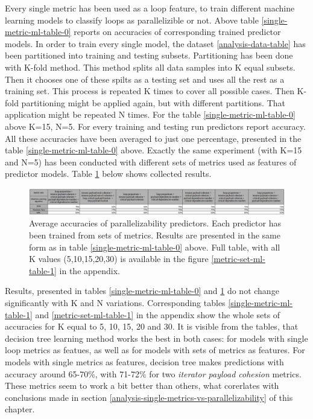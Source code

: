 \null\qquad Every single metric has been used as a loop feature, to train different machine learning models to classify loops as parallelizible or not. Above table \ref{single-metric-ml-table-0} reports on accuracies of corresponding trained predictor models. In order to train every single model, the dataset \ref{analysis-data-table} has been partitioned into training and testing subsets. Partitioning has been done with K-fold method. This method splits all data samples into K equal subsets. Then it chooses one of these spilts as a testing set and uses all the rest as a training set. This process is repeated K times to cover all possible cases. Then K-fold partitioning might be applied again, but with different partitions. That application might be repeated N times. For the table \ref{single-metric-ml-table-0} above K=15, N=5. For every training and testing run predictors report accuracy. All these accuracies have been averaged to just one percentage, presented in the table \ref{single-metric-ml-table-0} above.\newline
\null\qquad Exactly the same experiment (with K=15 and N=5) has been conducted with different sets of metrics used as features of predictor models. Table \ref{metric-set-ml-table-0} below shows collected results.
\begin{figure}[htb]
\centering
\includegraphics[width=\linewidth]{figs/metric-set-ml-table-0.png}
\caption{Average accuracies of parallelizability predictors. Each predictor has been trained from sets of metrics. Results are presented in the same form as in table \ref{single-metric-ml-table-0} above. Full table, with all K values (5,10,15,20,30) is available in the figure \ref{metric-set-ml-table-1} in the appendix.}
\label{metric-set-ml-table-0}
\end{figure}\newline
\null\qquad Results, presented in tables \ref{single-metric-ml-table-0} and \ref{metric-set-ml-table-0} do not change significantly with K and N variations. Corresponding tables \ref{single-metric-ml-table-1} and \ref{metric-set-ml-table-1} in the appendix show the whole sets of accuracies for K equal to 5, 10, 15, 20 and 30.\newline
\null\qquad It is visible from the tables, that decision tree learning method works the best in both cases: for models with single loop metrics as featues, as well as for models with sets of metrics as features. For models with single metrics as features, decision tree makes predictions with accuracy around 65-70\%, with 71-72\% for two \textit{iterator payload cohesion} metrics. These metrics seem to work a bit better than others, what corerlates with conclusions made in section \ref{analysis-single-metrics-vs-parallelizability} of this chapter.\newline
